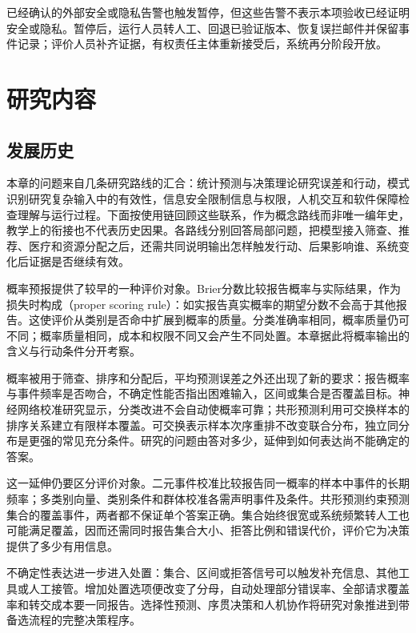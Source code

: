 已经确认的外部安全或隐私告警也触发暂停，但这些告警不表示本项验收已经证明安全或隐私。暂停后，运行人员转人工、回退已验证版本、恢复误拦邮件并保留事件记录；评价人员补齐证据，有权责任主体重新接受后，系统再分阶段开放。

\section{研究内容}
\label{sec:trust-research-content}

\subsection{发展历史}

本章的问题来自几条研究路线的汇合：统计预测与决策理论研究误差和行动，模式识别研究复杂输入中的有效性，信息安全限制信息与权限，人机交互和软件保障检查理解与运行过程。下面按使用链回顾这些联系，作为概念路线而非唯一编年史，教学上的衔接也不代表历史因果。各路线分别回答局部问题，把模型接入筛查、推荐、医疗和资源分配之后，还需共同说明输出怎样触发行动、后果影响谁、系统变化后证据是否继续有效。

概率预报提供了较早的一种评价对象。Brier分数比较报告概率与实际结果，作为损失时构成（proper scoring rule）：如实报告真实概率的期望分数不会高于其他报告。这使评价从类别是否命中扩展到概率的质量。分类准确率相同，概率质量仍可不同；概率质量相同，成本和权限不同又会产生不同处置。本章据此将概率输出的含义与行动条件分开考察。

概率被用于筛查、排序和分配后，平均预测误差之外还出现了新的要求：报告概率与事件频率是否吻合，不确定性能否指出困难输入，区间或集合是否覆盖目标。神经网络校准研究显示，分类改进不会自动使概率可靠；共形预测利用可交换样本的排序关系建立有限样本覆盖。可交换表示样本次序重排不改变联合分布，独立同分布是更强的常见充分条件。研究的问题由答对多少，延伸到如何表达尚不能确定的答案。

这一延伸仍要区分评价对象。二元事件校准比较报告同一概率的样本中事件的长期频率；多类别向量、类别条件和群体校准各需声明事件及条件。共形预测约束预测集合的覆盖事件，两者都不保证单个答案正确。集合始终很宽或系统频繁转人工也可能满足覆盖，因而还需同时报告集合大小、拒答比例和错误代价，评价它为决策提供了多少有用信息。

不确定性表达进一步进入处置：集合、区间或拒答信号可以触发补充信息、其他工具或人工接管。增加处置选项便改变了分母，自动处理部分错误率、全部请求覆盖率和转交成本要一同报告。选择性预测、序贯决策和人机协作将研究对象推进到带备选流程的完整决策程序。

